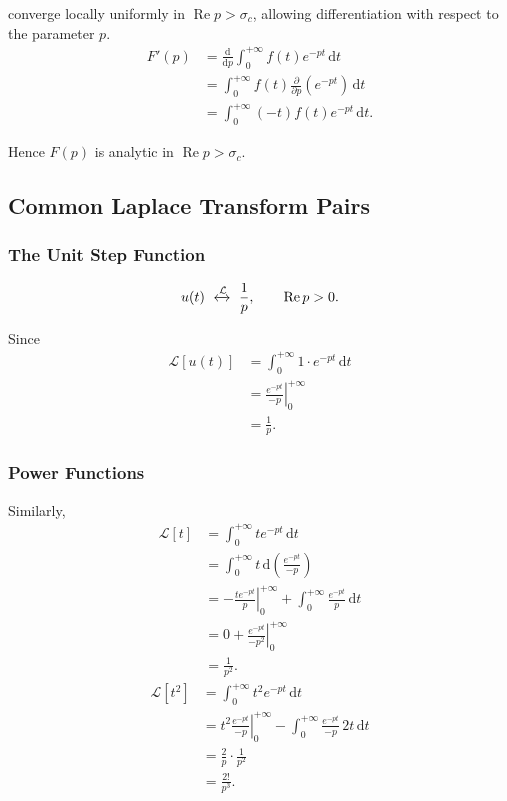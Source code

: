 \documentclass[11pt,a4paper]{article}
\theoremstyle{definition}
\theoremstyle{plain}
\begin{document}
converge locally uniformly in \(\operatorname{Re}p>\sigma_c\), allowing
differentiation with respect to the parameter \(p\).
\[
\begin{aligned}
F'(p)
&=\frac{\mathrm d}{\mathrm dp}
\int_0^{+\infty}f(t)e^{-pt}\,\mathrm dt\\
&=\int_0^{+\infty}
f(t)\frac{\partial}{\partial p}(e^{-pt})\,\mathrm dt\\
&=\int_0^{+\infty}(-t)f(t)e^{-pt}\,\mathrm dt.
\end{aligned}
\]

Hence \(F(p)\) is analytic in \(\operatorname{Re}p>\sigma_c\).

\subsection{Common Laplace Transform Pairs}

\subsubsection*{The Unit Step Function}
\[
u(t)\ \xleftrightarrow{\mathcal L}\ \frac1p,
\qquad \operatorname{Re}p>0.
\]

Since
\[
\begin{aligned}
\mathcal L[u(t)]
&=\int_0^{+\infty}1\cdot e^{-pt}\,\mathrm dt\\
&=\left.\frac{e^{-pt}}{-p}\right|_0^{+\infty}\\
&=\frac1p.
\end{aligned}
\]

\subsubsection*{Power Functions}

Similarly,
\[
\begin{aligned}
\mathcal L[t]
&=\int_0^{+\infty}te^{-pt}\,\mathrm dt\\
&=\int_0^{+\infty}t\,\mathrm d\!\left(\frac{e^{-pt}}{-p}\right)\\
&=\left.-\frac{te^{-pt}}p\right|_0^{+\infty}
+\int_0^{+\infty}\frac{e^{-pt}}p\,\mathrm dt\\
&=0+\left.\frac{e^{-pt}}{-p^2}\right|_0^{+\infty}\\
&=\frac1{p^2}.
\end{aligned}
\]
\[
\begin{aligned}
\mathcal L[t^2]
&=\int_0^{+\infty}t^2e^{-pt}\,\mathrm dt\\
&=\left.t^2\frac{e^{-pt}}{-p}\right|_0^{+\infty}
-\int_0^{+\infty}\frac{e^{-pt}}{-p}\,2t\,\mathrm dt\\
&=\frac2p\cdot\frac1{p^2}\\
&=\frac{2!}{p^3}.
\end{aligned}
\]
\end{document}
